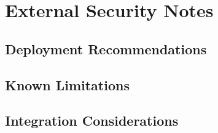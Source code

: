 \documentclass[../veristore_security_model.tex]{subfiles}
\begin{document}
\section{External Security Notes}


\subsection{Deployment Recommendations}


\subsection{Known Limitations}


\subsection{Integration Considerations}


\newpage
\end{document}
